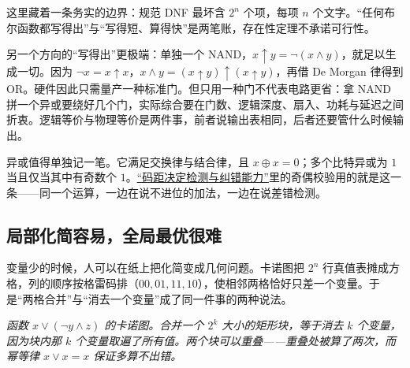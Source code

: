 这里藏着一条务实的边界：规范 DNF 最坏含 \(2^n\) 个项，每项 \(n\) 个文字。``任何布尔函数都写得出''与``写得短、算得快''是两笔账，存在性定理不承诺可行性。

另一个方向的``写得出''更极端：单独一个 NAND，\(x\uparrow y=\neg(x\land y)\)，就足以生成一切。因为 \(\neg x=x\uparrow x\)，\(x\land y=(x\uparrow y)\uparrow(x\uparrow y)\)，再借 De Morgan 律得到 OR。硬件因此只需量产一种标准门。但只用一种门不代表电路更省：拿 NAND 拼一个异或要绕好几个门，实际综合要在门数、逻辑深度、扇入、功耗与延迟之间折衷。逻辑等价与物理等价是两件事，前者说输出表相同，后者还要管什么时候输出。

异或值得单独记一笔。它满足交换律与结合律，且 \(x\oplus x=0\)；多个比特异或为 \(1\) 当且仅当其中有奇数个 \(1\)。\hyperref[sec:04-Discrete-Mathematics/05-Coding-and-Polynomial-Methods/02]{``码距决定检测与纠错能力''}里的奇偶校验用的就是这一条——同一个运算，一边在说不进位的加法，一边在说差错检测。

\subsection{局部化简容易，全局最优很难}

变量少的时候，人可以在纸上把化简变成几何问题。卡诺图把 \(2^n\) 行真值表摊成方格，列的顺序按格雷码排（\(00,01,11,10\)），使相邻两格恰好只差一个变量。于是``两格合并''与``消去一个变量''成了同一件事的两种说法。

\begin{center}

\emph{函数 \(x\lor(\neg y\land z)\) 的卡诺图。合并一个 \(2^k\) 大小的矩形块，等于消去 \(k\) 个变量，因为块内那 \(k\) 个变量取遍了所有值。两个块可以重叠——重叠处被算了两次，而幂等律 \(x\lor x=x\) 保证多算不出错。}
\end{center}

